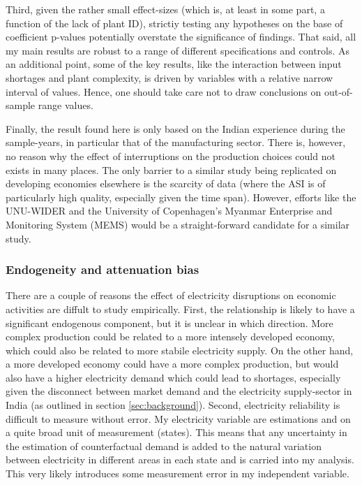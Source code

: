 \documentclass[11pt]{article}
\begin{document}
Third, given the rather small effect-sizes (which is, at least in some part, a function of the lack of plant ID), strictiy testing any hypotheses on the base of coefficient p-values potentially overstate the significance of findings. That said, all my main results are robust to a range of different specifications and controls. As an additional point, some of the key results, like the interaction between input shortages and plant complexity, is driven by variables with a relative narrow interval of values. Hence, one should take care not to draw conclusions on out-of-sample range values. 

Finally, the result found here is only based on the Indian experience during the sample-years, in particular that of the manufacturing sector. There is, however, no reason why the effect of interruptions on the production choices could not exists in many places. The only barrier to a similar study being replicated on developing economies elsewhere is the scarcity of data (where the ASI is of particularly high quality, especially given the time span). However, efforts like the UNU-WIDER and the University of Copenhagen's Myanmar Enterprise and Monitoring System (MEMS) would be a straight-forward candidate for a similar study.

\subsubsection{Endogeneity and attenuation bias}
\label{sec:orgd4457e7}
There are a couple of reasons the effect of electricity disruptions on economic activities are diffult to study empirically. First, the relationship is likely to have a significant endogenous component, but it is unclear in which direction. More complex production could be related to a more intensely developed economy, which could also be related to more stabile electricity supply. On the other hand, a more developed economy could have a more complex production, but would also have a higher electricity demand which could lead to shortages, especially given the disconnect between market demand and the electricity supply-sector in India (as outlined in section \ref{sec:background}). Second, electricity reliability is difficult to measure without error. My electricity variable are estimations and on a quite broad unit of measurement (states). This means that any uncertainty in the estimation of counterfactual demand is added to the natural variation between electricity in different areas in each state and is carried into my analysis. This very likely introduces some measurement error in my independent variable.
\end{document}
